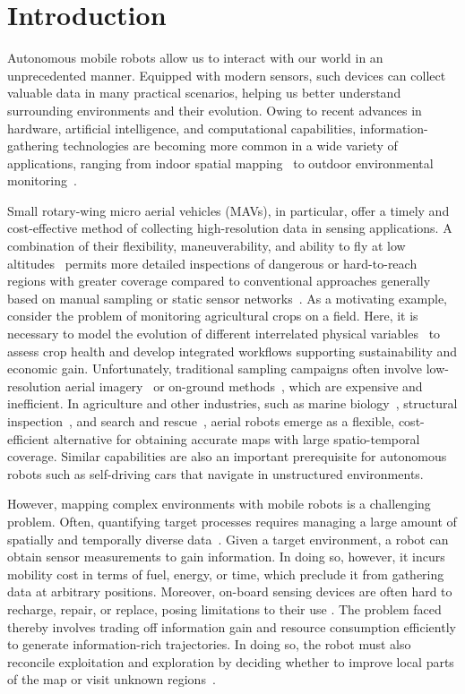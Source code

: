 \section{Introduction}
\label{S:introduction}

Autonomous mobile robots allow us to interact with our world in an unprecedented manner. Equipped 
with modern sensors, such devices can collect valuable data in many practical scenarios, helping us better 
understand surrounding environments and their evolution. Owing to recent advances in hardware, artificial 
intelligence, and computational capabilities, information-gathering technologies are becoming more 
common in a wide variety of applications, ranging from indoor spatial mapping~\cite{Charrow2015, 
Heng2014} to outdoor environmental monitoring~\cite{Dunbabin2012, Detweiler2015}.

Small rotary-wing micro aerial vehicles (MAVs), in particular, offer a timely and cost-effective method of 
collecting high-resolution data in sensing applications. A combination of their flexibility, maneuverability, 
and ability to fly at low altitudes~\cite{Anthony2014} permits more detailed inspections of dangerous or 
hard-to-reach regions with greater coverage compared to conventional approaches generally based on manual 
sampling or static sensor networks~\cite{Dunbabin2012, Krause2008, Phillips2012}. As a motivating example, 
consider the problem of monitoring agricultural crops on a field. Here, it is necessary to model the 
evolution of different interrelated physical variables~\cite{Cardina1997, Anthony2014, Detweiler2015} to 
assess crop health and develop integrated workflows supporting sustainability and economic gain. 
Unfortunately, traditional sampling campaigns often involve low-resolution aerial imagery~\cite{DeCastro2013} 
or on-ground methods~\cite{Borra-Serrano2015}, which are expensive and inefficient. In agriculture and other 
industries, such as marine biology~\cite{Hitz2015, Singh2010, Jadidi2016}, structural 
inspection~\cite{Isler2016,Bircher2016,Heng2015}, and search and rescue~\cite{Singh2009,Lim2015}, aerial 
robots 
emerge as a flexible, cost-efficient alternative for obtaining accurate maps with large spatio-temporal 
coverage. Similar capabilities are also an important prerequisite for autonomous robots such as 
self-driving cars that navigate in unstructured environments.

However, mapping complex environments with mobile robots is a challenging problem. Often, 
quantifying target processes requires managing a large amount of spatially and temporally diverse 
data~\cite{Dunbabin2012}. Given a target environment, a robot can obtain sensor measurements to gain 
information. In doing so, however, it incurs mobility cost in terms of fuel, energy, or time, which preclude 
it from gathering data at arbitrary positions. Moreover, on-board sensing devices are often hard to recharge, 
repair, or replace, posing limitations to their use \cite{Singh2009}. The problem faced thereby involves 
trading off information gain and resource consumption efficiently to generate information-rich trajectories. 
In doing so, the robot must also reconcile exploitation and exploration by deciding whether to improve local 
parts of the map or visit unknown regions~\cite{Charrow2015a}.

